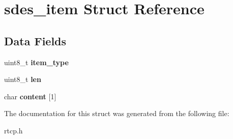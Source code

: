 \section{sdes\+\_\+item Struct Reference}
\label{structsdes__item}
\subsection*{Data Fields}
\begin{DoxyCompactItemize}
\item 
\mbox{\label{structsdes__item_ad2b59333892c51895d0c8a3643596983}} 
uint8\+\_\+t {\bfseries item\+\_\+type}
\item 
\mbox{\label{structsdes__item_a6137ed90f696671015a0aa1f9602dfb3}} 
uint8\+\_\+t {\bfseries len}
\item 
\mbox{\label{structsdes__item_abac9969613d25a126133e36e0663e88c}} 
char {\bfseries content} [1]
\end{DoxyCompactItemize}


The documentation for this struct was generated from the following file\+:\begin{DoxyCompactItemize}
\item 
rtcp.\+h\end{DoxyCompactItemize}
